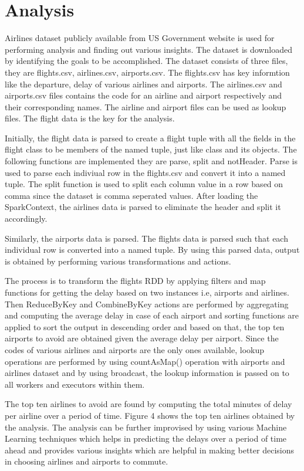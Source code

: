 \documentclass[9pt,twocolumn,twoside]{../../styles/osajnl}
\begin{document}
\section{Analysis}

Airlines dataset publicly available from US Government website is used
for performing analysis and finding out various insights. The dataset
is downloaded by identifying the goals to be accomplished. The dataset
consists of three files, they are flights.csv, airlines.csv,
airports.csv.  The flights.csv has key informtion like the departure,
delay of various airlines and airports. The airlines.csv and
airports.csv files contains the code for an airline and airport
respectively and their corresponding names.  The airline and airport
files can be used as lookup files. The flight data is the key for the analysis.

Initially, the flight data is parsed to create a flight tuple with all
the fields in the flight class to be members of the named tuple, just
like class and its objects. The following functions are implemented
they are parse, split and notHeader. Parse is used to parse each
indiviual row in the flights.csv and convert it into a named
tuple. The split function is used to split each column value in a row
based on comma since the dataset is comma seperated values. After
loading the SparkContext, the airlines data is parsed to eliminate the
header and split it accordingly.

Similarly, the airports data is parsed.  The flights data is parsed
such that each individual row is converted into a named tuple.  By
using this parsed data, output is obtained by performing various
transformations and actions.

The process is to transform the flights RDD by applying filters and
map functions for getting the delay based on two instances i.e,
airports and airlines. Then ReduceByKey and CombineByKey actions are
performed by aggregating and computing the average delay in case of
each airport and sorting functions are applied to sort the output in
descending order and based on that, the top ten airports to avoid are
obtained given the average delay per airport. Since the codes of
various airlines and airports are the only ones available, lookup
operations are performed by using countAsMap() operation with airports
and airlines dataset and by using broadcast, the lookup information is
passed on to all workers and executors within them.

The top ten airlines to avoid are found by computing the total minutes
of delay per airline over a period of time. Figure 4 shows the top
ten airlines obtained by the analysis. The analysis can be further
improvised by using various Machine Learning techniques which helps in
predicting the delays over a period of time ahead and provides various
insights which are helpful in making better decisions in choosing
airlines and airports to commute.
\end{document}
